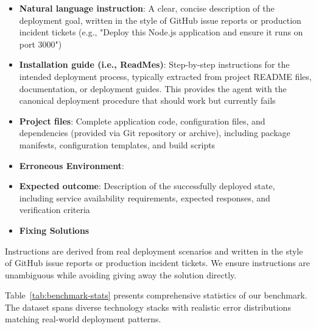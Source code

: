 \begin{itemize}
\item \textbf{Natural language instruction}: A clear, concise description of the deployment goal, written in the style of GitHub issue reports or production incident tickets (e.g., "Deploy this Node.js application and ensure it runs on port 3000")
\item \textbf{Installation guide (i.e., ReadMes)}: Step-by-step instructions for the intended deployment process, typically extracted from project README files, documentation, or deployment guides. This provides the agent with the canonical deployment procedure that should work but currently fails
\item \textbf{Project files}: Complete application code, configuration files, and dependencies (provided via Git repository or archive), including package manifests, configuration templates, and build scripts
\item \textbf{Erroneous Environment}: 
\item \textbf{Expected outcome}: Description of the successfully deployed state, including service availability requirements, expected responses, and verification criteria
\item \textbf{Fixing Solutions} 
\end{itemize}
Instructions are derived from real deployment scenarios and written in the style of GitHub issue reports or production incident tickets. We ensure instructions are unambiguous while avoiding giving away the solution directly.



Table~\ref{tab:benchmark-stats} presents comprehensive statistics of our benchmark. The dataset spans diverse technology stacks with realistic error distributions matching real-world deployment patterns.

